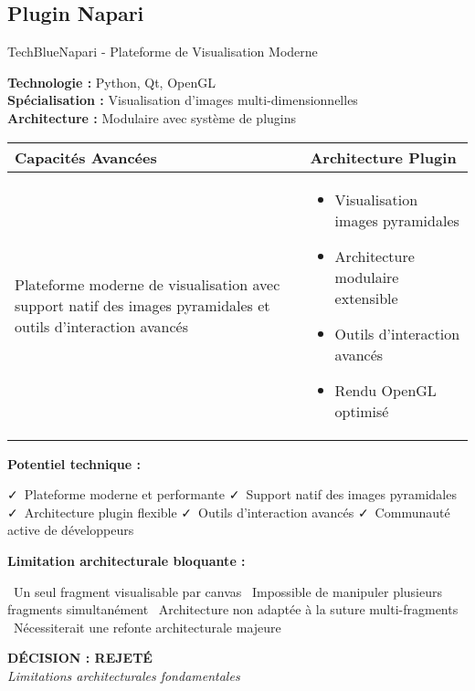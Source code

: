 \documentclass[11pt,a4paper]{article}
\newcommand{\pro}[1]{\textcolor{SuccessGreen}{\faCheck\ #1}}
\newcommand{\con}[1]{\textcolor{DangerRed}{\faTimes\ #1}}
\begin{document}
\subsection{Plugin Napari}

\begin{techbox}{TechBlue}{Napari - Plateforme de Visualisation Moderne}

\textbf{Technologie :} Python, Qt, OpenGL \\
\textbf{Spécialisation :} Visualisation d'images multi-dimensionnelles \\
\textbf{Architecture :} Modulaire avec système de plugins

\vspace{0.5cm}

\begin{tabularx}{\textwidth}{|X|X|}
\hline
\rowcolor{LightGray}
\textbf{Capacités Avancées} & \textbf{Architecture Plugin} \\
\hline
Plateforme moderne de visualisation avec support natif des images pyramidales et outils d'interaction avancés &
\begin{itemize}[nosep]
\item Visualisation images pyramidales
\item Architecture modulaire extensible
\item Outils d'interaction avancés
\item Rendu OpenGL optimisé
\end{itemize} \\
\hline
\end{tabularx}

\vspace{0.5cm}

\textbf{Potentiel technique :}
\begin{itemize}[leftmargin=*]
    \pro{Plateforme moderne et performante}
    \pro{Support natif des images pyramidales}
    \pro{Architecture plugin flexible}
    \pro{Outils d'interaction avancés}
    \pro{Communauté active de développeurs}
\end{itemize}

\textbf{Limitation architecturale bloquante :}
\begin{itemize}[leftmargin=*]
    \con{Un seul fragment visualisable par canvas}
    \con{Impossible de manipuler plusieurs fragments simultanément}
    \con{Architecture non adaptée à la suture multi-fragments}
    \con{Nécessiterait une refonte architecturale majeure}
\end{itemize}

\begin{center}
\textbf{\textcolor{DangerRed}{DÉCISION : REJETÉ}}\\
\textit{Limitations architecturales fondamentales}
\end{center}

\end{techbox}
\end{document}
